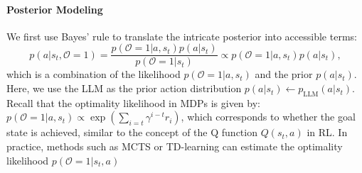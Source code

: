 \documentclass{article} %
\theoremstyle{plain}
\theoremstyle{definition}
\theoremstyle{remark}
\newcommand{\fig}{{Figure }}
\newcommand{\yan}[1]{{ \color{blue}[yan: #1]}}
\begin{document}
{\paragraph{Posterior Modeling}
We first use Bayes' rule to translate the intricate posterior into accessible terms:  
\begin{equation}
p(a|s_t, \mathcal{O}=1) =\frac{p(\mathcal{O}=1|a,s_t)p(a|s_t)}{p(\mathcal{O}=1|s_t)}\propto p(\mathcal{O}=1|a,s_t)p(a|s_t),
\end{equation}
which is a combination of the likelihood $p(\mathcal{O}=1|a,s_t)$ and the prior $p(a|s_t)$. Here, we use the LLM as the prior action distribution $p(a|s_t)\leftarrow p_\text{LLM}(a|s_t)$. %
Recall that the optimality likelihood in MDPs is given by: $ p(\mathcal{O}=1|a, s_t) \propto \exp\left(\sum_{i=t}  \gamma^{i-t}r_i\right) $, which corresponds to whether the goal state is achieved, similar to the concept of the Q function $Q(s_t,a)$ in RL. In practice, methods such as MCTS or TD-learning can estimate the optimality likelihood $p(\mathcal{O}=1|s_t, a)$ %

}
\end{document}
